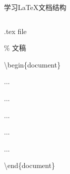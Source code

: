 \documentclass[xcolor=svgnames, t, aspectratio=169]{ctexbeamer}
\begin{document}
\begin{frame}[t, fragile]{学习\LaTeX}{文档结构}
\begin{columns}
\begin{column}{0.45\textwidth}
\begin{block}{.tex file}
{       \par
       { \% 文稿 \par
       \textbackslash begin\{document\} \par
       ... \par
        \par
       \quad ... \par
        \par
       \qquad ... \par
       \quad {} \par
       \qquad ... \par
        \par
       ... \par
       \par
       \textbackslash end\{document\} \par
       } }
     \end{block}
   \end{column}
 \end{columns}
\end{frame}
\end{document}
